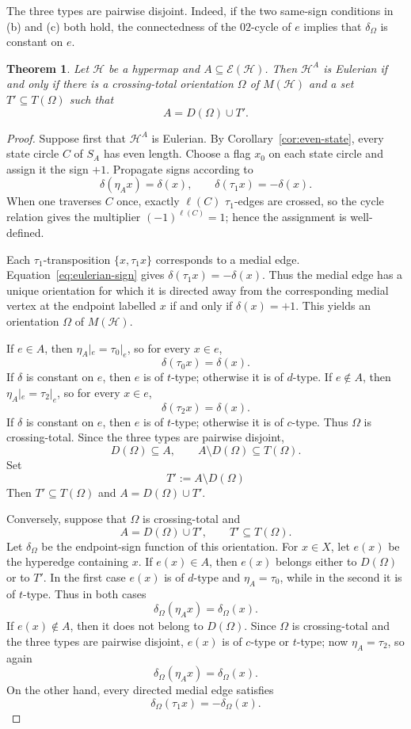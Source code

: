 \documentclass[10pt,a4paper]{article}
\newtheorem{theorem}{Theorem}[section]
\theoremstyle{definition}
\theoremstyle{remark}
\newcommand{\Hcal}{\mathcal{H}}
\newcommand{\Ecal}{\mathcal{E}}
\begin{document}
The three types are pairwise disjoint. Indeed, if the two same-sign conditions in (b) and (c) both hold, the connectedness of the $02$-cycle of $e$ implies that $\delta_\Omega$ is constant on $e$.


\begin{theorem}\label{thm:eulerian}
Let $\Hcal$ be a hypermap and $A\subseteq\Ecal(\Hcal)$. Then $\Hcal^A$ is Eulerian if and only if there is a crossing-total orientation $\Omega$ of $M(\Hcal)$ and a set $T'\subseteq T(\Omega)$ such that
\[
 A=D(\Omega)\cup T'.
\]
\end{theorem}



\begin{proof}
Suppose first that $\Hcal^A$ is Eulerian. By Corollary~\ref{cor:even-state}, every state circle $C$ of $S_A$ has even length. Choose a flag $x_0$ on each state circle and assign it the sign $+1$. Propagate signs according to
\[
  \delta(\eta_Ax)=\delta(x),\qquad
  \delta(\tau_1x)=-\delta(x).
  \tag{E}\label{eq:eulerian-sign}
\]
When one traverses $C$ once, exactly $\ell(C)$ $\tau_1$-edges are crossed, so the cycle relation gives the multiplier $(-1)^{\ell(C)}=1$; hence the assignment is well-defined.

Each $\tau_1$-transposition $\{x,\tau_1x\}$ corresponds to a medial edge. Equation~\eqref{eq:eulerian-sign} gives $\delta(\tau_1x)=-\delta(x)$. Thus the medial edge has a unique orientation for which it is directed away from the corresponding medial vertex at the endpoint labelled $x$ if and only if $\delta(x)=+1$. This yields an orientation $\Omega$ of $M(\Hcal)$.

If $e\in A$, then $\eta_A|_e=\tau_0|_e$, so for every $x\in e$,
\[
  \delta(\tau_0x)=\delta(x).
\]
If $\delta$ is constant on $e$, then $e$ is of $t$-type; otherwise it is of $d$-type. If $e\notin A$, then $\eta_A|_e=\tau_2|_e$, so for every $x\in e$,
\[
  \delta(\tau_2x)=\delta(x).
\]
If $\delta$ is constant on $e$, then $e$ is of $t$-type; otherwise it is of $c$-type. Thus $\Omega$ is crossing-total. Since the three types are pairwise disjoint,
\[
  D(\Omega)\subseteq A,\qquad
  A\setminus D(\Omega)\subseteq T(\Omega).
\]
Set
\[
  T':=A\setminus D(\Omega)
\]
Then $T'\subseteq T(\Omega)$ and $A=D(\Omega)\cup T'$.

Conversely, suppose that $\Omega$ is crossing-total and
\[
  A=D(\Omega)\cup T',\qquad T'\subseteq T(\Omega).
\]
Let $\delta_\Omega$ be the endpoint-sign function of this orientation. For $x\in X$, let $e(x)$ be the hyperedge containing $x$. If $e(x)\in A$, then $e(x)$ belongs either to $D(\Omega)$ or to $T'$. In the first case $e(x)$ is of $d$-type and $\eta_A=\tau_0$, while in the second it is of $t$-type. Thus in both cases
\[
  \delta_\Omega(\eta_Ax)=\delta_\Omega(x).
\]
If $e(x)\notin A$, then it does not belong to $D(\Omega)$. Since $\Omega$ is crossing-total and the three types are pairwise disjoint, $e(x)$ is of $c$-type or $t$-type; now $\eta_A=\tau_2$, so again
\[
  \delta_\Omega(\eta_Ax)=\delta_\Omega(x).
\]
On the other hand, every directed medial edge satisfies
\[
  \delta_\Omega(\tau_1x)=-\delta_\Omega(x).
\]


\end{proof}
\end{document}
